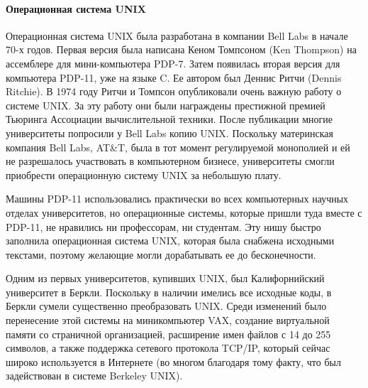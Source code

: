 \documentclass[10pt]{article}
\begin{document}
	\paragraph{Операционная система UNIX}
	Операционная система UNIX была разработана в компании Bell Labs в начале 70-х годов. Первая версия была написана Кеном Томпсоном (Ken Thompson) на ассемблере для мини-компьютера PDP-7. Затем появилась вторая версия для компьютера PDP-11, уже на языке C. Ее автором был Деннис Ритчи (Dennis Ritchie). В 1974 году Ритчи и Томпсон опубликовали очень важную работу о системе UNIX. За эту работу они были награждены престижной премией Тьюринга Ассоциации вычислительной техники. После публикации многие университеты попросили у Bell Labs копию UNIX. Поскольку материнская компания Bell Labs, AT\&T, была в тот момент регулируемой монополией и ей не разрешалось участвовать в компьютерном бизнесе, университеты смогли приобрести операционную систему UNIX за небольшую плату.

	Машины PDP-11 использовались практически во всех компьютерных научных отделах университетов, но операционные системы, которые  пришли туда вместе с PDP-11, не нравились ни профессорам, ни студентам. Эту нишу быстро заполнила операционная система UNIX, которая была снабжена исходными текстами, поэтому желающие могли дорабатывать ее до бесконечности.

	Одним из первых университетов, купивших UNIX, был Калифорнийский университет в Беркли. Поскольку в наличии имелись все исходные коды, в Беркли сумели существенно преобразовать UNIX. Среди изменений было перенесение этой системы на миникомпьютер VAX, создание виртуальной памяти со страничной организацией, расширение имен файлов с 14 до 255 символов, а также поддержка сетевого протокола TCP/IP, который сейчас широко используется в  Интернете (во многом благодаря тому факту, что был задействован в системе Berkeley UNIX).
\end{document}
